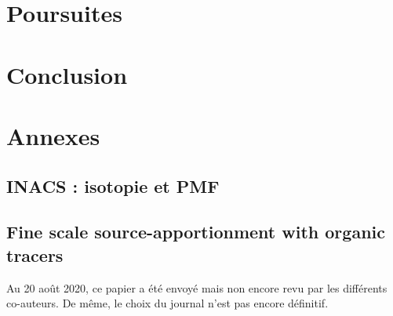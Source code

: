 \documentclass[a4paper,11pt]{book}
\begin{document}
\chapter{Poursuites}
\label{cha:travaux_futur}
\PartialToc
\clearpage

\clearpage
\printbibliography[segment=\therefsegment,heading=subbibliography]

\chapter*{Conclusion}%
\label{cha:conclusion}

\clearpage

\printbibliography

\listoftables
\listoffigures



\chapter*{Annexes}
\PartialToc

\fancyhead[L]{\small\textsl{\rightmark}}
\setcounter{table}{0}
\setcounter{figure}{0}
\setcounter{equation}{0}
\setcounter{section}{0}
\renewcommand{\thetable}{\thesection-\arabic{table}}
\renewcommand{\thefigure}{\thesection-\arabic{figure}}
\renewcommand{\theequation}{\thesection-\arabic{equation}}
\makeatletter
\renewcommand\thesection{Annexe \@Roman\c@section}
\renewcommand\thesubsection{Annexe \@Roman\c@section-\@arabic\c@subsection}
\makeatother

\clearpage
\section{INACS : isotopie et PMF}%
\label{annexe:INACS}


\section{Fine scale source-apportionment with organic tracers}%
\label{annexe:borlazaSA}
\begin{tcolorbox}[colback=red!5!white,colframe=blue,title=Note]
    Au 20 août 2020, ce papier a été envoyé mais non encore revu par les différents
    co-auteurs. De même, le choix du journal n'est pas encore définitif.
\end{tcolorbox}

\end{document}
